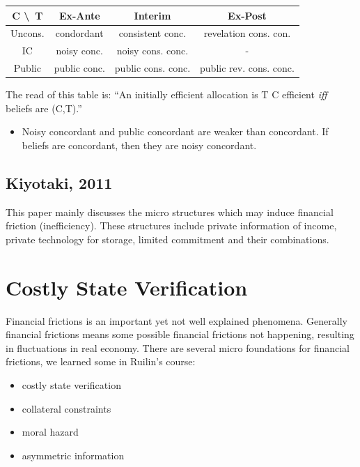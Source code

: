 \documentclass{book}
\theoremstyle{plain}
\theoremstyle{definition}
\begin{document}
\begin{table}[h]
\centering
\begin{tabular}{cccc}
\hline
C \textbackslash\  T & \cellcolor[HTML]{C0C0C0}Ex-Ante & \cellcolor[HTML]{C0C0C0}Interim & \cellcolor[HTML]{C0C0C0}Ex-Post \\ \hline
\cellcolor[HTML]{C0C0C0}Uncons. & condordant & consistent conc. & revelation cons. con. \\
\cellcolor[HTML]{C0C0C0}IC & noisy conc. & {\color[HTML]{3166FF} noisy cons. conc.} & - \\
\cellcolor[HTML]{C0C0C0}Public & public conc. & public cons. conc. & {\color[HTML]{FE0000} public rev. cons. conc.}
\end{tabular}
\end{table}

The read of this table is: ``An initially efficient allocation is T C efficient \textit{iff} beliefs are (C,T).''

\begin{itemize}
	\item Noisy concordant and public concordant are weaker than concordant. If beliefs are concordant, then they are noisy concordant.
\end{itemize}




\section{Kiyotaki, 2011} %
\label{sec:kiyotaki_2011}

\textbf{}

This paper mainly discusses the micro structures which may induce financial friction (inefficiency). These structures include private information of income, private technology for storage, limited commitment and their combinations.





\chapter{Costly State Verification} %
\label{cha:costly_state_verification}

Financial frictions is an important yet not well explained phenomena. Generally financial frictions means some possible financial frictions not happening, resulting in fluctuations in real economy. There are several micro foundations for financial frictions, we learned some in Ruilin's course:
\begin{itemize}
	\item costly state verification
	\item collateral constraints
	\item moral hazard
	\item asymmetric information
\end{itemize}
\end{document}
